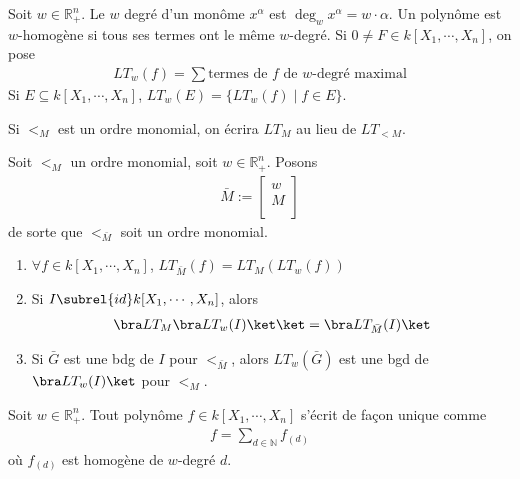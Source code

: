         \begin{defi}
            Soit $w \in \mathbb{R}^n_+$. Le $w$ degré d'un monôme $x^\alpha$ est $\deg_w x^\alpha = w \cdot \alpha$. Un polynôme est $w$-homogène si tous ses termes ont le même $w$-degré. Si $0 \neq F \in k[X_1, \cdots, X_n]$, on pose 
            \begin{align*}
                LT_w(f) = \sum \text{termes de $f$ de $w$-degré maximal}
            \end{align*}
            Si $E \subseteq k[X_1, \cdots, X_n]$, $LT_w(E) = \{LT_w(f) \mid f \in E\}$.
        \end{defi}
        \begin{nota}
            Si $<_M$ est un ordre monomial, on écrira $LT_M$ au lieu de $LT_{<M}$.
        \end{nota}
        \begin{prop}
            Soit $<_M$ un ordre monomial, soit $w \in \mathbb{R}_+^n$. Posons
            \begin{align*}
                \bar M :=
                \begin{bmatrix}
                    w \\
                    M \\
                \end{bmatrix}
            \end{align*}
            de sorte que $<_{\bar M}$ soit un ordre monomial.
            \begin{enumerate}
                \item $\forall f \in k[X_1, \cdots, X_n]$, $LT_{\bar M}(f) = LT_M(LT_w(f))$
                \item Si $I \subrel{id} k[X_1, \cdots, X_n]$, alors
                \begin{align*}
                    \bra LT_M \bra LT_w(I) \ket \ket = \bra LT_{\bar M}(I) \ket
                \end{align*}
                \item Si $\bar G$ est une bdg de $I$ pour $<_{\bar M}$, alors $LT_w(\bar G)$ est une bgd de $\bra LT_w(I) \ket$ pour $<_M$.
            \end{enumerate}
        \end{prop}
        \begin{lemm}
            Soit $w \in \mathbb{R}_+^n$. Tout polynôme $f \in k[X_1, \cdots, X_n]$ s'écrit de façon unique comme 
            \begin{align*}
                f = \sum_{d \in \mathbb{N}} f_{(d)}
            \end{align*}
            où $f_{(d)}$ est homogène de $w$-degré $d$.
        \end{lemm}
